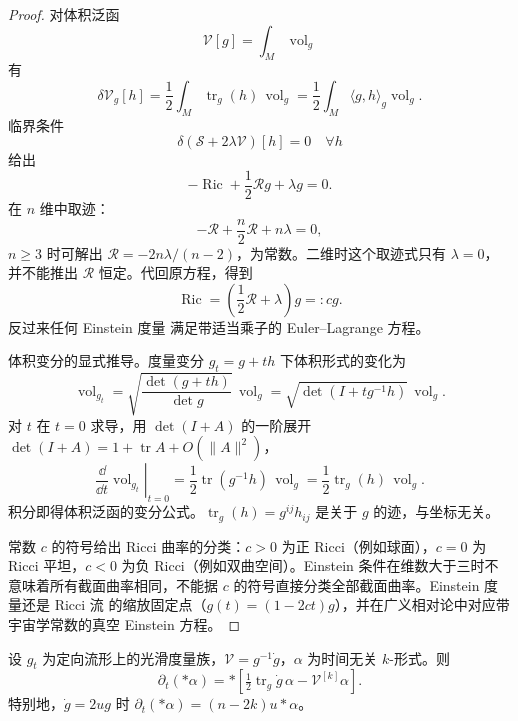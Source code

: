 \begin{proof}
对体积泛函
\[
\mathcal V[g]=\int_M\operatorname{vol}_g
\]
有
\[
\delta\mathcal V_g[h]
=\frac12\int_M\operatorname{tr}_g(h)\,\operatorname{vol}_g
=\frac12\int_M\langle g,h\rangle_g\operatorname{vol}_g.
\]
临界条件
\[
\delta(\mathcal S+2\lambda\mathcal V)[h]=0
\quad\forall h
\]
给出
\[
-\operatorname{Ric}+\frac12\mathcal R g+\lambda g=0.
\]
在 $n$ 维中取迹：
\[
-\mathcal R+\frac n2\mathcal R+n\lambda=0,
\]
$n\ge3$ 时可解出 $\mathcal R=-2n\lambda/(n-2)$，为常数。二维时这个取迹式只有 $\lambda=0$，并不能推出 $\mathcal R$ 恒定。代回原方程，得到
\[
\operatorname{Ric}=\left(\frac12\mathcal R+\lambda\right)g=:cg.
\]
反过来任何 Einstein 度量 满足带适当乘子的 Euler--Lagrange 方程。

体积变分的显式推导。度量变分 $g_t=g+th$ 下体积形式的变化为
\begin{equation*}
\operatorname{vol}_{g_t}
=\sqrt{\frac{\det(g+th)}{\det g}}\,\operatorname{vol}_g
=\sqrt{\det(I+tg^{-1}h)}\,\operatorname{vol}_g.
\end{equation*}
对 $t$ 在 $t=0$ 求导，用 $\det(I+A)$ 的一阶展开 $\det(I+A)=1+\operatorname{tr}A+O(\|A\|^2)$，
\begin{equation*}
\left.\frac{\dd}{\dd t}\operatorname{vol}_{g_t}\right|_{t=0}
=\frac12\operatorname{tr}(g^{-1}h)\,\operatorname{vol}_g
=\frac12\operatorname{tr}_g(h)\,\operatorname{vol}_g.
\end{equation*}
积分即得体积泛函的变分公式。$\operatorname{tr}_g(h)=g^{ij}h_{ij}$ 是关于 $g$ 的迹，与坐标无关。

常数 $c$ 的符号给出 Ricci 曲率的分类：$c>0$ 为正 Ricci（例如球面），$c=0$ 为 Ricci 平坦，$c<0$ 为负 Ricci（例如双曲空间）。Einstein 条件在维数大于三时不意味着所有截面曲率相同，不能据 $c$ 的符号直接分类全部截面曲率。Einstein 度量还是 Ricci 流 的缩放固定点（$g(t)=(1-2ct)g$），并在广义相对论中对应带宇宙学常数的真空 Einstein 方程。
\end{proof}

\begin{proposition}
设 $g_t$ 为定向流形上的光滑度量族，$\mathcal V=g^{-1}\dot g$，$\alpha$ 为时间无关 $k$-形式。则\[\partial_t(*\alpha)=*\left[\tfrac12\operatorname{tr}_g\dot g\,\alpha-\mathcal V^{[k]}\alpha\right].\]特别地，$\dot g=2ug$ 时 $\partial_t(*\alpha)=(n-2k)u*\alpha$。
\end{proposition}

